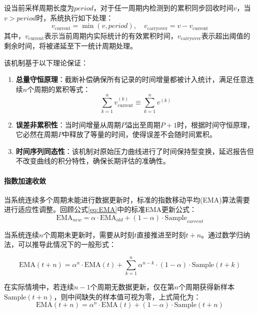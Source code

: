 设当前采样周期长度为\(\textit{period}\)，对于任一周期内检测到的累积同步回收时间\(v\)，当\(v > \textit{period}\)时，系统执行如下处理：
\begin{equation}
v_{\text{current}} = \min(v, \textit{period}), \quad v_{\text{carryover}} = v - v_{\text{current}}
\end{equation}
其中，\(v_{\text{current}}\)表示当前周期内实际统计的有效累积时间，\(v_{\text{carryover}}\)表示超出阈值的剩余时间，将被递延至下一统计周期处理。

该机制基于以下理论保证：
\begin{enumerate}
    \item \textbf{总量守恒原理}：截断补偿确保所有记录的时间增量都被计入统计，满足任意连续\(n\)个周期的累积等式：
    \begin{equation}
        \sum_{k=1}^n v_{\text{current}}^{(k)} \equiv \sum_{k=1}^n v^{(k)}
    \end{equation}
    \item \textbf{误差非累积性}：当时间增量从周期\(P\)溢出至周期\(P+1\)时，根据时间守恒原理，它必然在周期\(P\)中释放了等量的时间，使得误差不会随时间累积。
    \item \textbf{时间序列同态性}：该机制对原始压力曲线进行了时间保持型变换，延迟报告但不改变曲线的积分特性，确保长期评估的准确性。
\end{enumerate}

\paragraph{指数加速收敛} \quad 当系统连续多个周期未能进行数据更新时，标准的指数移动平均(EMA)算法需要进行适应性调整。回顾公式\ref{eq:EMA}中的标准EMA更新公式：
\begin{equation}
    \text{EMA}_{new} = \alpha \cdot \text{EMA}_{old} + (1-\alpha) \cdot \text{Sample}_{current}
\end{equation}

当系统连续\(n\)个周期未更新时，需要从时刻\(t\)直接推进至时刻\(t+n\)。通过数学归纳法，可以推导此情况下的一般形式：

\begin{equation}
\text{EMA}(t+n) = \alpha^n \cdot \text{EMA}(t) + \sum_{k=1}^{n} \alpha^{n-k} \cdot (1-\alpha) \cdot \text{Sample}(t+k)
\end{equation}

在实际情境中，若连续\(n-1\)个周期无数据更新，仅在第\(n\)个周期获得新样本\(\text{Sample}(t+n)\)，则中间缺失的样本值可视为零，上式简化为：
\begin{equation}
\label{eq:EMA_2}
\text{EMA}(t+n) = \alpha^n \cdot \text{EMA}(t) + (1-\alpha) \cdot \text{Sample}(t+n)
\end{equation}

